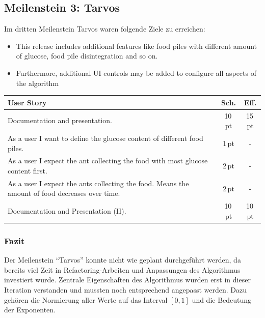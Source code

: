 \subsection{Meilenstein 3: Tarvos}

Im dritten Meilenstein Tarvos waren folgende Ziele zu erreichen:

\begin{itemize}[noitemsep]
\item This release includes additional features like food piles with different
amount of glucose, food pile disintegration and so on.
\item Furthermore, additional UI controls may be added to configure all aspects
of the algorithm
\end{itemize}

\begin{table}[H]
\small\sffamily\renewcommand{\arraystretch}{1.5}
\begin{tabular}{| p{12cm} | c | c |}
  \hline
  \bfseries{User Story} & \bfseries{Sch.} & \bfseries{Eff.}  \\
  \hline
  Documentation and presentation. & 10\,pt & 15\,pt \\
  \hline
  As a user I want to define the glucose content of different food piles. &
  1\,pt & - \\
  \hline
  As a user I expect the ant collecting the food with most glucose content first. & 2\,pt & - \\
  \hline
  As a user I expect the ants collecting the food. Means the amount of food decreases over time. & 2\,pt & - \\
  \hline
  Documentation and Presentation (II). & 10\,pt & 10\,pt \\
  \hline
\end{tabular}
\end{table}

\subsubsection*{Fazit}

Der Meilenstein ``Tarvos'' konnte nicht wie geplant durchgeführt werden, da 
bereits viel Zeit in Refactoring-Arbeiten und Anpassungen des Algorithmus 
investiert wurde. Zentrale Eigenschaften des Algorithmus wurden erst in dieser
Iteration verstanden und mussten noch entsprechend angepasst werden. Dazu 
gehören die Normierung aller Werte auf das Interval $[0,1]$ und die Bedeutung
der Exponenten.
